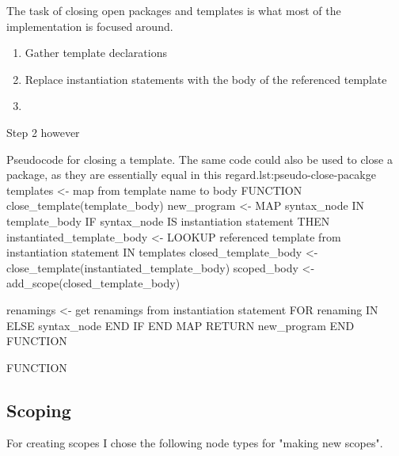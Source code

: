 The task of closing open packages and templates is what most of the implementation is focused around.


\begin{enumerate}
    \item Gather template declarations
    \item Replace instantiation statements with the body of the referenced template
    \item 
\end{enumerate}

Step 2 however

\begin{code}{}{Pseudocode for closing a template. The same code could also be used to close a package, as they are essentially equal in this regard.}{lst:pseudo-close-pacakge}
    templates <- map from template name to body
    FUNCTION close_template(template_body)
        new_program <-
            MAP syntax_node IN template_body
                IF syntax_node IS instantiation statement THEN
                    instantiated_template_body <- LOOKUP referenced template from instantiation statement IN templates
                    closed_template_body <- close_template(instantiated_template_body)
                    scoped_body <- add_scope(closed_template_body)

                    renamings <- get renamings from instantiation statement
                    FOR renaming IN
                ELSE
                    syntax_node
                END IF
            END MAP
        RETURN new_program
    END FUNCTION

    FUNCTION
\end{code}

\subsection{Scoping}\label{subsec:inst-scoping}

For creating scopes I chose the following node types for "making new scopes".

